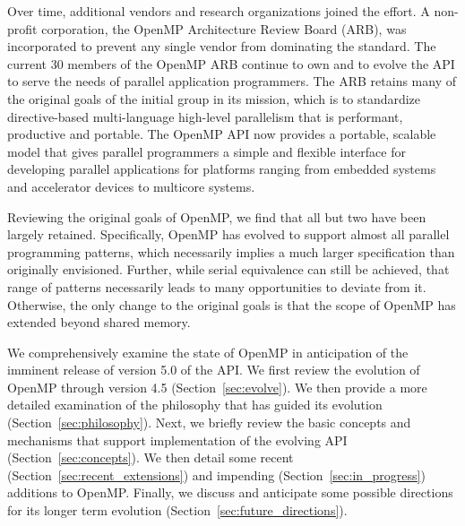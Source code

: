 Over time, additional vendors and research organizations joined the effort.  A
non-profit corporation, the OpenMP Architecture Review Board (ARB), was 
incorporated to prevent any single vendor from dominating the standard.
The current 30 members of the OpenMP ARB continue to own and to evolve 
the API to serve the needs of parallel application programmers. The ARB
retains many of the original goals of the initial group in its mission,
which is to standardize directive-based multi-language high-level 
parallelism that is performant, productive and portable. The OpenMP 
API now provides a portable, scalable model that gives parallel 
programmers a simple and flexible interface for developing parallel 
applications for platforms ranging from embedded systems and accelerator 
devices to multicore systems.

Reviewing the original goals of OpenMP, we find that all but two have 
been largely retained. Specifically, OpenMP has evolved to support almost 
all parallel programming patterns, which necessarily implies a much larger 
specification than originally envisioned. Further, while serial equivalence
can still be achieved, that range of patterns necessarily leads to many
opportunities to deviate from it. Otherwise, the only change to the original
goals is that the scope of OpenMP has extended beyond shared memory. 

We comprehensively examine the state of OpenMP in anticipation of the imminent 
release of version 5.0 of the API. We first review the evolution of OpenMP 
through version 4.5 (Section~\ref{sec:evolve}). We then provide a more 
detailed examination of the philosophy that has guided its evolution 
(Section~\ref{sec:philosophy}). Next, we briefly review the basic concepts 
and mechanisms that support implementation of the evolving API 
(Section~\ref{sec:concepts}). We then detail some recent 
(Section~\ref{sec:recent_extensions}) and impending 
(Section~\ref{sec:in_progress}) additions to OpenMP. Finally, we discuss
and anticipate some possible directions for its longer term evolution
(Section~\ref{sec:future_directions}).
